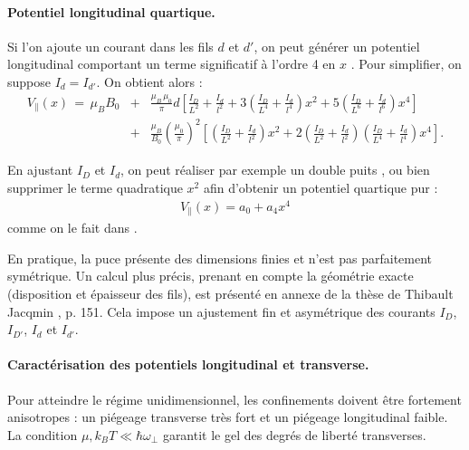 \medskip


 \paragraph{Potentiel longitudinal quartique.}
Si l’on ajoute un courant dans les fils $d$ et $d'$, on peut générer un potentiel longitudinal comportant un terme significatif à l’ordre 4 en $x$ . Pour simplifier, on suppose $I_d=I_{d'}$. On obtient alors : 
 \begin{eqnarray*}
 	V_\parallel(x) \, = \, \mu_B B_0  & + & 	 \frac{\mu_B \, \mu_0}{\pi} d  \left [ \frac{I_D}{L^2} + \frac{I_d}{l^2} + 3 \left ( \frac{I_D}{L^4} + \frac{I_d}{l^4} \right ) x^2  +  5 \left ( \frac{I_D}{L^6} + \frac{I_d}{l^6} \right ) x^4 \right ] \\
 	& + & \frac{\mu_B}{B_0} \left ( \frac{\mu_0}{\pi} \right )^2  \left [ \left ( \frac{I_D}{L^2} + \frac{I_d}{l^2} \right ) x^2  + 2 \left ( \frac{I_D}{L^2} + \frac{I_d}{l^2} \right )\left ( \frac{I_D}{L^4} + \frac{I_d}{l^4} \right ) x^4 \right ].
 \end{eqnarray*}
 
 En ajustant $I_D$ et $I_d$, on peut réaliser par exemple un double puits \cite{PhysRevLett.122.090601}, ou bien supprimer le terme quadratique $x^2$ afin d’obtenir un potentiel quartique pur :
\begin{eqnarray*}
	V_\parallel(x) = a_0 + a_4 x^4 	
\end{eqnarray*}
comme on le fait dans \cite{Dubois2025}.

\medskip

En pratique, la puce présente des dimensions finies et n’est pas parfaitement symétrique. Un calcul plus précis, prenant en compte la géométrie exacte (disposition et épaisseur des fils), est présenté en annexe de la thèse de Thibault Jacqmin \cite{jacqm2012}, p. 151. Cela impose un ajustement fin et asymétrique des courants $I_D$, $I_{D'}$, $I_d$ et $I_{d'}$.

\medskip


\paragraph{Caractérisation des potentiels longitudinal et transverse.}
Pour atteindre le régime unidimensionnel, les confinements doivent être fortement anisotropes : un piégeage transverse très fort et un piégeage longitudinal faible. La condition \(\mu, k_B T \ll \hbar \omega_\perp\) garantit le gel des degrés de liberté transverses.

